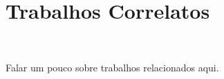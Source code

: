 \section{Trabalhos Correlatos}~\label{sec:correlated_works}

Falar um pouco sobre trabalhos relacionados aqui.